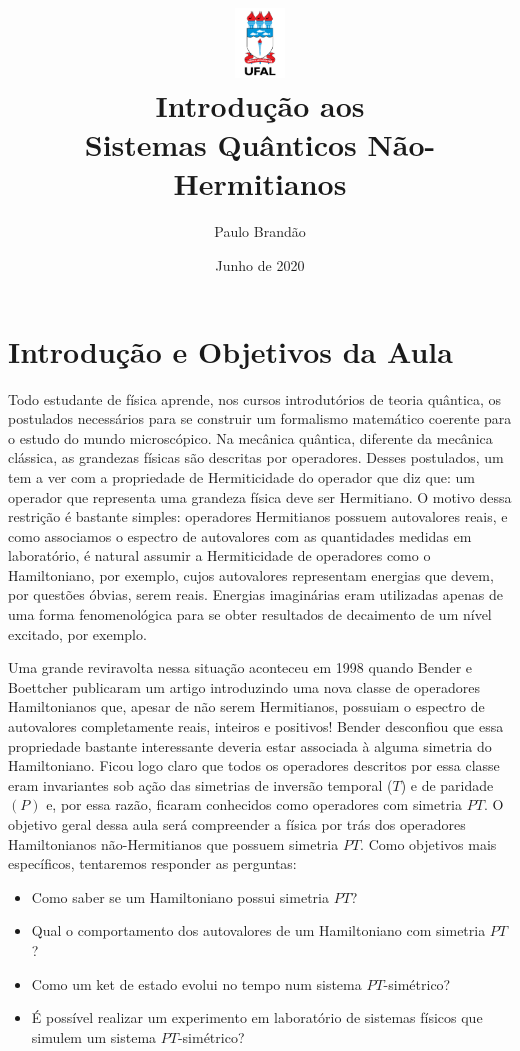 \documentclass{article}
\title{\includegraphics[width=0.1\textwidth]{ufallogo.png} \\
\Huge{\color{astral}\textbf{Introdução aos \\Sistemas Quânticos Não-Hermitianos}}}
\author{Paulo Brandão}
\date{Junho de 2020}
\begin{document}
\maketitle

\section{Introdução e Objetivos da Aula}

Todo estudante de física aprende, nos cursos introdutórios de teoria quântica, os postulados necessários para se construir um formalismo matemático coerente para o estudo do mundo microscópico. Na mecânica quântica, diferente da mecânica clássica, as grandezas físicas são descritas por operadores. Desses postulados, um tem a ver com a propriedade de Hermiticidade do operador que diz que: um operador que representa uma grandeza física deve ser Hermitiano. O motivo dessa restrição é bastante simples: operadores Hermitianos possuem autovalores reais, e como associamos o espectro de autovalores com as quantidades medidas em laboratório, é natural assumir a Hermiticidade de operadores como o Hamiltoniano, por exemplo, cujos autovalores representam energias que devem, por questões óbvias, serem reais. Energias imaginárias eram utilizadas apenas de uma forma fenomenológica para se obter resultados de decaimento de um nível excitado, por exemplo.

Uma grande reviravolta nessa situação aconteceu em 1998 quando Bender e Boettcher publicaram um artigo introduzindo uma nova classe de operadores Hamiltonianos que, apesar de não serem Hermitianos, possuiam o espectro de autovalores completamente reais, inteiros e positivos! Bender desconfiou que essa propriedade bastante interessante deveria estar associada à alguma simetria do Hamiltoniano. Ficou logo claro que todos os operadores descritos por essa classe eram invariantes sob ação das simetrias de inversão temporal ($T$) e de paridade $(P)$ e, por essa razão, ficaram conhecidos como operadores com simetria $PT$. O objetivo geral dessa aula será compreender a física por trás dos operadores Hamiltonianos não-Hermitianos que possuem simetria $PT$. Como objetivos mais específicos, tentaremos responder as perguntas:
\begin{itemize}
    \item Como saber se um Hamiltoniano possui simetria $PT$?
    \item Qual o comportamento dos autovalores de um Hamiltoniano com simetria $PT$?
    \item Como um ket de estado evolui no tempo num sistema $PT$-simétrico?
    \item É possível realizar um experimento em laboratório de sistemas físicos que simulem um sistema $PT$-simétrico?
\end{itemize}
\end{document}
